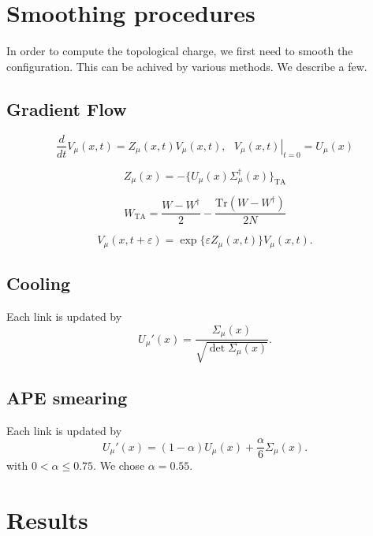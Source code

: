 \documentclass[12pt,a4paper]{article}
\begin{document}
\section{Smoothing procedures}

In order to compute the topological charge, we first need to smooth the configuration. This can be achived by various methods. We describe a few.

\subsection{Gradient Flow}
\begin{equation}
    \frac{d}{dt}V_{\mu}(x,t) = Z_{\mu}(x,t)V_{\mu}(x,t) , \ \ \  \left. {V_{\mu}(x,t)}\right|_{t = 0} = U_{\mu}(x)
\end{equation}

\begin{equation}
         Z_{\mu}(x) = -\{U_{\mu}(x)\Sigma_{\mu}^{\dagger}(x)\}_{\text{TA}}
\end{equation}

\begin{equation}
    W_{\text{TA}} = \frac{W - W^{\dagger}}{2} - \frac{\text{Tr} (W - W^{\dagger})}{2N}
\end{equation}

\begin{equation}
    V_{\mu}(x,t+\varepsilon) = \exp\{\varepsilon Z_{\mu}(x,t)\}V_{\mu}(x,t).
\end{equation}
%



\subsection{Cooling}
Each link is updated by
\begin{equation}
    U_{\mu}'(x) = \frac{\Sigma_{\mu}(x)}{\sqrt{\det \Sigma_{\mu}(x)}}.
\end{equation}
\subsection{APE smearing}
Each link is updated by 
\begin{equation}
    U_{\mu}'(x) = (1-\alpha)U_{\mu}(x)+ \frac{\alpha}{6}\Sigma_{\mu}(x).
\end{equation}
with $0<\alpha\leq 0.75$. We chose $\alpha = 0.55$.

\section{Results}
\end{document}
